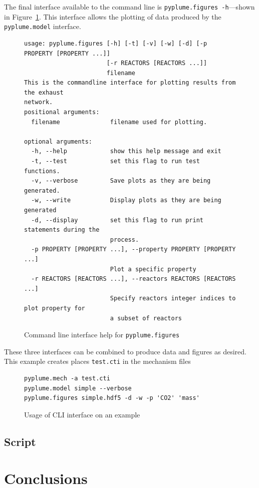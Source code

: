 \documentclass[smallextended,referee]{svjour3}
\newenvironment{codeblock}[1]
{
\begin{figure}[hbt]
\newcommand{\captionMacro}{#1}
\centering
\begin{tcolorbox}[width=15cm]
}
{
\end{tcolorbox}
\caption{\captionMacro{}}
\end{figure}
}
\begin{document}
The final interface available to the command line is \texttt{pyplume.figures -h}---shown in Figure~\ref{code:figures}. This interface allows the plotting of data produced by the \texttt{pyplume.model} interface.

\begin{codeblock}{Command line interface help for \texttt{pyplume.figures}}
\begin{lstlisting}
usage: pyplume.figures [-h] [-t] [-v] [-w] [-d] [-p PROPERTY [PROPERTY ...]]
                       [-r REACTORS [REACTORS ...]]
                       filename
This is the commandline interface for plotting results from the exhaust
network.
positional arguments:
  filename              filename used for plotting.

optional arguments:
  -h, --help            show this help message and exit
  -t, --test            set this flag to run test functions.
  -v, --verbose         Save plots as they are being generated.
  -w, --write           Display plots as they are being generated
  -d, --display         set this flag to run print statements during the
                        process.
  -p PROPERTY [PROPERTY ...], --property PROPERTY [PROPERTY ...]
                        Plot a specific property
  -r REACTORS [REACTORS ...], --reactors REACTORS [REACTORS ...]
                        Specify reactors integer indices to plot property for
                        a subset of reactors
\end{lstlisting}
\label{code:figures}
\end{codeblock}
These three interfaces can be combined to produce data and figures as desired. This example creates places \texttt{test.cti} in the mechanism files

\begin{codeblock}{Usage of CLI interface on an example}
\begin{lstlisting}
pyplume.mech -a test.cti
pyplume.model simple --verbose
pyplume.figures simple.hdf5 -d -w -p 'CO2' 'mass'
\end{lstlisting}
\label{code:CLI}
\end{codeblock}



\subsection{\textbf{Script}}




\section{Conclusions}

\begin{acknowledgements}

\end{acknowledgements}

\appendix




\end{document}
